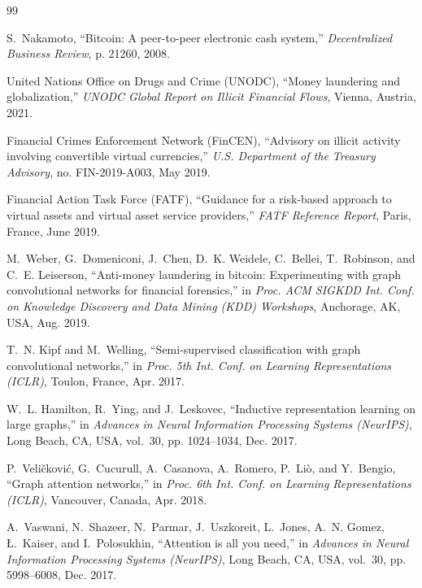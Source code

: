 
\begin{thebibliography}{99}

S.~Nakamoto, ``Bitcoin: A peer-to-peer electronic cash system,'' \emph{Decentralized Business Review}, p. 21260, 2008.

United Nations Office on Drugs and Crime (UNODC), ``Money laundering and globalization,'' \emph{UNODC Global Report on Illicit Financial Flows}, Vienna, Austria, 2021.

Financial Crimes Enforcement Network (FinCEN), ``Advisory on illicit activity involving convertible virtual currencies,'' \emph{U.S. Department of the Treasury Advisory}, no. FIN-2019-A003, May 2019.

Financial Action Task Force (FATF), ``Guidance for a risk-based approach to virtual assets and virtual asset service providers,'' \emph{FATF Reference Report}, Paris, France, June 2019.

M.~Weber, G.~Domeniconi, J.~Chen, D.~K. Weidele, C.~Bellei, T.~Robinson, and C.~E. Leiserson, ``Anti-money laundering in bitcoin: Experimenting with graph convolutional networks for financial forensics,'' in \emph{Proc. ACM SIGKDD Int. Conf. on Knowledge Discovery and Data Mining (KDD) Workshops}, Anchorage, AK, USA, Aug. 2019.

T.~N. Kipf and M.~Welling, ``Semi-supervised classification with graph convolutional networks,'' in \emph{Proc. 5th Int. Conf. on Learning Representations (ICLR)}, Toulon, France, Apr. 2017.

W.~L. Hamilton, R.~Ying, and J.~Leskovec, ``Inductive representation learning on large graphs,'' in \emph{Advances in Neural Information Processing Systems (NeurIPS)}, Long Beach, CA, USA, vol.~30, pp. 1024--1034, Dec. 2017.

P.~Veli{\v{c}}kovi{\'{c}}, G.~Cucurull, A.~Casanova, A.~Romero, P.~Li{\`{o}}, and Y.~Bengio, ``Graph attention networks,'' in \emph{Proc. 6th Int. Conf. on Learning Representations (ICLR)}, Vancouver, Canada, Apr. 2018.

A.~Vaswani, N.~Shazeer, N.~Parmar, J.~Uszkoreit, L.~Jones, A.~N. Gomez, {\L}.~Kaiser, and I.~Polosukhin, ``Attention is all you need,'' in \emph{Advances in Neural Information Processing Systems (NeurIPS)}, Long Beach, CA, USA, vol.~30, pp. 5998--6008, Dec. 2017.


\end{thebibliography}
